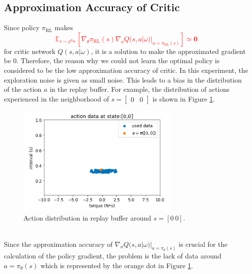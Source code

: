 \documentclass[english, dvipdfmx]{ampmt}             %
\newcommand{\unc}[1]{\textcolor{red}{#1}} %
\newcommand{\expect}{\mathbb{E}}
\begin{document}
\subsection{Approximation Accuracy of Critic}
Since policy $\pi_{\textrm{RL}}$ makes
\unc{
\begin{equation}
	\expect_{s\sim\rho^{\pi_{\textrm{RL}}}}[
	\nabla_{\theta}\pi_{\textrm{RL}}(s)\nabla_{a}Q(s,a|\omega)|_{a=\pi_{\textrm{RL}}(s)}] \simeq \bm{0}
\end{equation}
}for critic network $Q(s,a|\omega)$, it is a solution to make the approximated gradient be 0. Therefore, the reason why we could not learn the optimal policy is considered to be the low approximation accuracy of critic. In this experiment, the exploration noise is given as small noise. This leads to a bias in the distribution of the action $a$ in the replay buffer. For example, the distribution of actions experienced in the neighborhood of $s=\begin{bmatrix}0 & 0\end{bmatrix}$ is shown in Figure \ref{data_distribution}.
\begin{figure}[h]
	\centering
 	\includegraphics[width=8cm]{data_distribution.png}
 	\caption{Action distribution in replay buffer around $s=[0~0]$.} \label{data_distribution}
\end{figure}\\
Since the approximation accuracy of $\nabla_{a} Q(s,a|\omega)|_{a=\pi_{\theta}(s)}$ is crucial for the calculation of the policy gradient, the problem is the lack of data around $a=\pi_{\theta}(s)$ which is represented by the orange dot in Figure \ref{data_distribution}.
\end{document}
